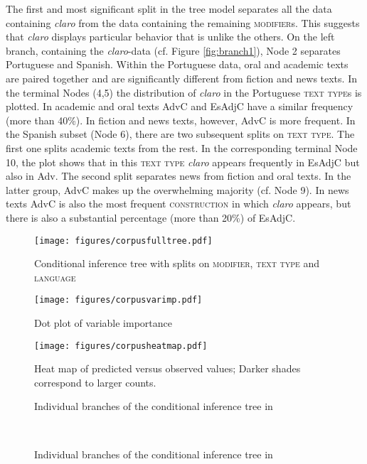The first and most significant split in the tree model separates all the data containing \textit{claro} from the data containing the remaining \textsc{modifier}s. This suggests that \textit{claro} displays particular behavior that is unlike the others. On the left branch, containing the \textit{claro}-data (cf. Figure \ref{fig:branch1}), Node 2 separates Portuguese and Spanish. Within the Portuguese data,  oral and academic texts are paired together and are significantly different from fiction and news texts. In the terminal Nodes (4,5) the distribution of \textit{claro} in the Portuguese \textsc{text type}s is plotted. In academic and oral texts AdvC and EsAdjC have a similar frequency (more than 40\%). In fiction and news texts, however, AdvC is more frequent. In the Spanish subset (Node 6), there are two subsequent splits on \textsc{text type}. The first one splits academic texts from the rest. In the corresponding terminal Node 10, the plot shows that in this \textsc{text type} \textit{claro} appears frequently in EsAdjC but also in Adv. The second split separates news from fiction and oral texts. In the latter group, AdvC makes up the overwhelming majority (cf. Node 9). In news texts AdvC is also the most frequent \textsc{construction} in which \textit{claro} appears, but there is also a substantial percentage (more than 20\%) of EsAdjC.  


\begin{figure}
\texttt{[image: figures/corpusfulltree.pdf]}
\caption{Conditional inference tree with splits on \textsc{modifier}, \textsc{text type} and \textsc{language}\label{fig:corpctree}}	
\end{figure}	


\begin{figure}
\begin{floatrow}
\captionsetup{margin=.05\linewidth}
\ffigbox
	{\texttt{[image: figures/corpusvarimp.pdf]}}
	{\caption{Dot plot of variable importance\label{fig:corpvarimp}}}
\ffigbox
	{\texttt{[image: figures/corpusheatmap.pdf]}}
	{\caption{Heat map of predicted versus observed values; Darker  shades   correspond to larger counts.\label{fig:corpheatmap}}}
\end{floatrow}
\end{figure}	

\begin{figure}
	
	
	\caption{Individual branches of the conditional inference tree in  \label{fig:corptreesplit}}
\end{figure}
\begin{figure}
	\smallskip\\
	\caption{Individual branches of the conditional inference tree in }
\end{figure}


